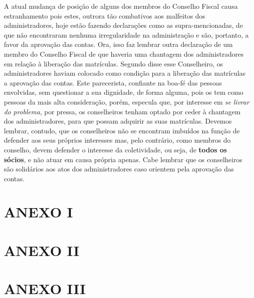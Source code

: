 \documentclass[
  letterpaper,
  DIV=11,
  numbers=noendperiod]{scrreprt}
\begin{document}
A atual mudança de posição de alguns dos membros do Conselho Fiscal
causa estranhamento pois estes, outrora tão combativos aos malfeitos dos
administradores, hoje estão fazendo declarações como as
supra-mencionadas, de que não encontraram nenhuma irregularidade na
administração e são, portanto, a favor da aprovação das contas. Ora,
isso faz lembrar outra declaração de um membro do Conselho Fiscal de que
haveria uma chantagem dos administradores em relação à liberação das
matrículas. Segundo disse esse Conselheiro, os administradores haviam
colocado como condição para a liberação das matrículas a aprovação das
contas. Este parecerista, confiante na boa-fé das pessoas envolvidas,
sem questionar a sua dignidade, de forma alguma, pois os tem como
pessoas da mais alta consideração, porém, especula que, por interesse em
\emph{se livrar do problema}, por pressa, os conselheiros tenham optado
por ceder à chantagem dos administradores, para que possam adquirir as
suas matrículas. Devemos lembrar, contudo, que os conselheiros não se
encontram imbuídos na função de defender aos seus próprios interesses
mas, pelo contrário, como membros do conselho, devem defender o
interesse da coletividade, ou seja, de \textbf{todos os sócios}, e não
atuar em causa própria apenas. Cabe lembrar que os conselheiros são
solidários aos atos dos administradores caso orientem pela aprovação das
contas.


\chapter*{ANEXO I}\label{anexo-i}





\chapter*{ANEXO II\textbar{}}\label{anexo-ii}





\chapter*{ANEXO III}\label{anexo-iii}
\end{document}
